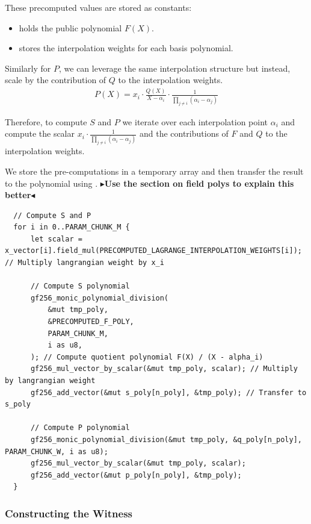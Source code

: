 \documentclass[11pt]{report}
\theoremstyle{definition}
\theoremstyle{plain}
\newcommand{\todo}[1]{{\color[rgb]{.5,0,0}\textbf{$\blacktriangleright$#1$\blacktriangleleft$}}}
\begin{document}
These precomputed values are stored as constants:
\begin{itemize}
  \item {} holds the public polynomial $F(X)$.
  \item {} stores the interpolation weights for each basis polynomial.
\end{itemize}

Similarly for $P$, we can leverage the same interpolation structure but instead, scale by the contribution of $Q$ to the interpolation weights.
\begin{align*}
  P(X) = x_i \cdot \frac{Q(X)}{X - \alpha_i} \cdot \frac{1}{\prod_{j\neq i}(\alpha_i - \alpha_j)}
\end{align*}

Therefore, to compute $S$ and $P$ we iterate over each interpolation point $\alpha_i$ and compute the scalar $x_i \cdot \frac{1}{\prod_{j\neq i}(\alpha_i - \alpha_j)}$ and the contributions of $F$ and $Q$ to the interpolation weights.

We store the pre-computations in a temporary array  and then transfer the result to the polynomial  using .
\todo{Use the section on field polys to explain this better}
\begin{verbatim}
  // Compute S and P
  for i in 0..PARAM_CHUNK_M {
      let scalar = x_vector[i].field_mul(PRECOMPUTED_LAGRANGE_INTERPOLATION_WEIGHTS[i]); // Multiply langrangian weight by x_i

      // Compute S polynomial
      gf256_monic_polynomial_division(
          &mut tmp_poly,
          &PRECOMPUTED_F_POLY,
          PARAM_CHUNK_M,
          i as u8,
      ); // Compute quotient polynomial F(X) / (X - alpha_i)
      gf256_mul_vector_by_scalar(&mut tmp_poly, scalar); // Multiply by langrangian weight
      gf256_add_vector(&mut s_poly[n_poly], &tmp_poly); // Transfer to s_poly

      // Compute P polynomial
      gf256_monic_polynomial_division(&mut tmp_poly, &q_poly[n_poly], PARAM_CHUNK_W, i as u8);
      gf256_mul_vector_by_scalar(&mut tmp_poly, scalar);
      gf256_add_vector(&mut p_poly[n_poly], &tmp_poly);
  }
\end{verbatim}

\subsubsection{Constructing the Witness}
\end{document}

